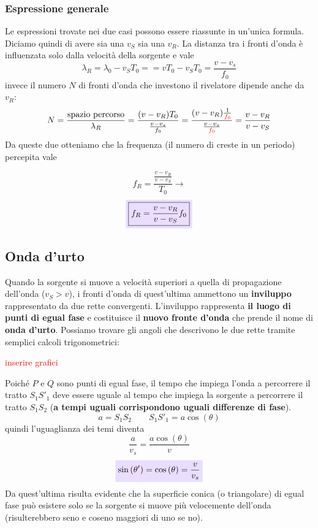 \documentclass[x11names]{article}
\newcommand{\viola}[1]{\colorbox{yred}{$\displaystyle #1$}}
\begin{document}
		\subsubsection{Espressione generale}
	Le espressioni trovate nei due casi possono essere riassunte in un'unica formula. Diciamo quindi di avere sia una \(v_S\) sia una \(v_R\). La distanza tra i fronti d'onda è influenzata solo dalla velocità della sorgente e vale
	\[ 
	\lambda_R = \lambda_0 - v_ST_0 = = vT_0 - v_ST_0 = \frac{v - v_s}{f_0}
	\]
	invece il numero \(N\) di fronti d'onda che investono il rivelatore dipende anche da \(v_R\):
	\[ 
	N = \frac{\text{spazio percorso}}{\lambda_R} = \frac{(v - v_R)T_0}{\frac{v - v_s}{f_0}} = \frac{(v - v_R)\frac{1}{\textcolor{red}{f_0}}}{\frac{v - v_s}{\textcolor{red}{f_0}}} = \frac{v - v_R}{v - v_S}
	\]
	Da queste due otteniamo che la frequenza (il numero di creste in un periodo) percepita vale
	
	\[ 
	f_R = \frac{\frac{v - v_R}{v-v_S}}{T_0} \to
	\]
	\begin{equation}
		  \viola{\boxed{f_R = \frac{v - v_R}{v-v_S}f_0}}
	\end{equation}

	\subsection{Onda d'urto}
	Quando la sorgente si muove a velocità superiori a quella di propagazione dell'onda (\(v_S > v\)), i fronti d'onda di quest'ultima ammettono un \textbf{inviluppo} rappresentato da due rette convergenti. L'inviluppo rappresenta \textbf{il luogo di punti di egual fase} e costituisce il  \textbf{nuovo fronte d'onda} che prende il nome di \textbf{onda d'urto}. Possiamo trovare gli angoli che descrivono le due rette tramite semplici calcoli trigonometrici: 
	\begin{center}
		\textcolor{red}{inserire grafici}
	\end{center}
	Poiché \(P\) e \(Q\) sono punti di egual fase, il tempo che impiega l'onda a percorrere il tratto \(S_1S'_1\) deve essere uguale al tempo che impiega la sorgente a percorrere il tratto \(S_1S_2\) (\textbf{a tempi uguali corrispondono uguali differenze di fase}).
	\[ 
	\boxed{a = S_1S_2} \qquad \boxed{S_1S'_1 = a\cos\left(\theta\right)}
	\]
	quindi l'uguaglianza dei temi diventa
	\[ 
	\frac{a}{v_s} = \frac{a\cos\left(\theta\right)}{v}
	\]
	\begin{equation}
		\viola{\sin\left(\theta'\right) = \cos\left(\theta\right) = \frac{v}{v_s} }
	\end{equation}
	Da quest'ultima risulta evidente che la superficie conica (o triangolare) di egual fase può esistere solo se la sorgente si muove più velocemente dell'onda (risulterebbero seno e coseno maggiori di uno se no).
	
\end{document}
